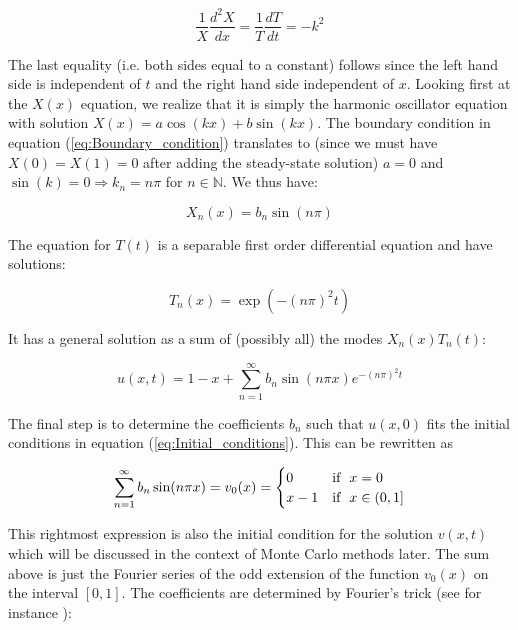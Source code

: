 \documentclass[a4paper, 11pt, notitlepage,english]{article}
\begin{document}
\begin{equation}
\frac{1}{X} \frac{d^2 X}{dx} = \frac{1}{T}\frac{dT}{dt} = -k^2
\label{eq:Separated_equation}
\end{equation}

The last equality (i.e. both sides equal to a constant) follows since the left hand side is independent of $t$ and the right hand side independent of $x$. Looking first at the $X(x)$ equation, we realize that it is simply the harmonic oscillator equation with solution $X(x) = a\cos(kx) + b\sin(kx)$. The boundary condition in equation (\ref{eq:Boundary_condition}) translates to (since we must have $X(0) = X(1) = 0$ after adding the steady-state solution) $a = 0$ and $\sin(k) = 0 \Rightarrow k_n = n\pi$ for $n \in \mathbb{N}$. We thus have:

\begin{equation}
X_n(x) = b_n \sin(n\pi)
\label{eq:Separated_X_solution}
\end{equation}

The equation for $T(t)$ is a separable first order differential equation and have solutions:

\begin{equation}
T_n(x) = \exp(-(n\pi)^2t)
\label{eq:Separated_T_solution}
\end{equation}

It has a general solution as a sum of (possibly all) the modes $X_n(x)T_n(t)$:

\begin{equation}
u(x,t) = 1-x +\sum_{n=1}^{\infty} b_n \sin(n\pi x) e^{-(n\pi)^2t}
\label{eq:General_solution}
\end{equation}

The final step is to determine the coefficients $b_n$ such that $u(x,0)$ fits the initial conditions in equation (\ref{eq:Initial_conditions}). This can be rewritten as 

\begin{equation}
\sum_{n=1}^{\infty} b_n \sin(n\pi x) = v_0(x) =  \begin{cases} 0 & \mathrm{if} \hspace{2mm} x = 0 \\
x-1 & \mathrm{if} \hspace{2mm} x \in (0,1] \end{cases}
\label{eq:Initial_cond_fit}
\end{equation}

This rightmost expression is also the initial condition for the solution $v(x,t)$ which will be discussed in the context of Monte Carlo methods later. The sum above is just the Fourier series of the odd extension of the function $v_0(x)$ on the interval $[0,1]$. The coefficients are determined by Fourier's trick (see for instance \cite{Boas}):
\end{document}
